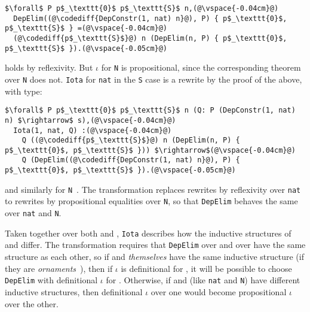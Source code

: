 \begin{lstlisting}
$\forall$ P p$_\texttt{0}$ p$_\texttt{S}$ n,(@\vspace{-0.04cm}@)
  DepElim((@\codediff{DepConstr(1, nat) n}@), P) { p$_\texttt{0}$, p$_\texttt{S}$ } =(@\vspace{-0.04cm}@)
  (@\codediff{p$_\texttt{S}$}@) n (DepElim(n, P) { p$_\texttt{0}$, p$_\texttt{S}$ }).(@\vspace{-0.05cm}@)
\end{lstlisting}
holds by reflexivity.
But $\iota$ for \lstinline{N} is propositional, since the corresponding 
theorem over \lstinline{N} does not.
\lstinline{Iota} for \lstinline{nat} in the \lstinline{S} case is a rewrite by the proof of the above,
with type:

\begin{lstlisting}
$\forall$ P p$_\texttt{0}$ p$_\texttt{S}$ n (Q: P (DepConstr(1, nat) n) $\rightarrow$ s),(@\vspace{-0.04cm}@)
  Iota(1, nat, Q) :(@\vspace{-0.04cm}@)
    Q ((@\codediff{p$_\texttt{S}$}@) n (DepElim(n, P) { p$_\texttt{0}$, p$_\texttt{S}$ })) $\rightarrow$(@\vspace{-0.04cm}@)
    Q (DepElim((@\codediff{DepConstr(1, nat) n}@), P) { p$_\texttt{0}$, p$_\texttt{S}$ }).(@\vspace{-0.05cm}@)
\end{lstlisting}
and similarly for \lstinline{N}~.
The transformation replaces rewrites by reflexivity over \lstinline{nat} to rewrites by propositional equalities over \lstinline{N},
so that \lstinline{DepElim} behaves the same over \lstinline{nat} and \lstinline{N}.

Taken together over both \A and \B, \lstinline{Iota} describes how the inductive structures of \A and \B differ.
The transformation requires that \lstinline{DepElim} over \A and over \B have the same structure
as each other, so if \A and \B \textit{themselves} have the same 
inductive structure (if they are \textit{ornaments}~\cite{mcbride}),
then if $\iota$ is definitional for \A, it will be possible to choose
\lstinline{DepElim} with definitional $\iota$ for \B.
Otherwise, if \A and \B (like \lstinline{nat} and \lstinline{N}) have different inductive structures,
then definitional $\iota$ over one would become propositional $\iota$ over the other.

